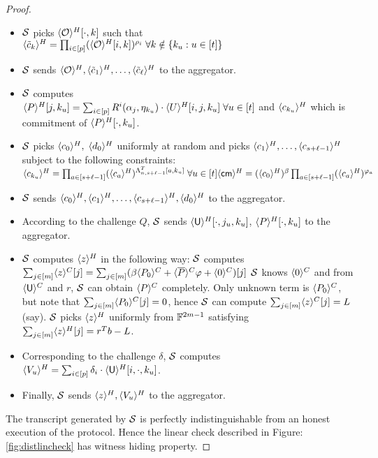 \begin{proof}
\begin{itemize}
		\item $\mathcal{S}$ picks $\langle{\mathcal{O}}\rangle^H[\cdot,k]$ such that\\
		$\langle{\tilde{c}_k}\rangle^H = \prod_{i\in[p]} (\langle{\mathcal{O}}\rangle^H[i,k])^{\rho_i} \; \forall k\notin \{k_u:u\in[t]\}$
		
		\item $\mathcal{S}$ sends $\langle{\mathcal{O}}\rangle^H, \langle{\tilde{c}_{1}}\rangle^H, \ldots, \langle{\tilde{c}_{\ell}}\rangle^H$ to the aggregator.
		
		\item $\mathcal{S}$ computes\\
		 $\langle{P}\rangle^H[j,k_u] = \sum_{i\in[p]} R^i(\alpha_j, \eta_{k_u})\cdot \langle{U}\rangle^H[i,j,k_u] \; \forall u\in[t]$ and $\langle{c_{k_u}}\rangle^H$ which is commitment of $\langle{P}\rangle^H[\cdot,k_u]$.
		 
		 \item $\mathcal{S}$ picks $\langle{c_0}\rangle^H,\;\langle{d_0}\rangle^H$ uniformly at random and picks $\langle{c_1}\rangle^H, \ldots, \langle{c_{s+\ell-1}}\rangle^H$ subject to the following constraints:\\
		 	$\langle{c_{k_u}}\rangle^H = \prod_{a\in[s+\ell-1]}(\langle{c_a}\rangle^H)^{\Lambda_{n,s+\ell-1}^T[a,k_u]} \; \forall u\in[t]\\
		 	\langle{\mathsf{cm}}\rangle^H = (\langle{c_0}\rangle^H)^{\beta}\prod_{a\in[s+\ell-1]} (\langle{c_a}\rangle^H)^{\varphi_a}$
		 
		 \item $\mathcal{S}$ sends $\langle{c_0}\rangle^H, \langle{c_1}\rangle^H,\ldots, \langle{c_{s+\ell-1}}\rangle^H, \langle{d_0}\rangle^H$ to the aggregator.
		 
		 \item According to the challenge $Q$, $\mathcal{S}$ sends $\langle{\mathsf{U}}\rangle^H[\cdot, j_u,k_u]$, $\langle{P}\rangle^H[\cdot,k_u]$ to the aggregator.
		 
		 \item $\mathcal{S}$ computes $\langle{z}\rangle^H$ in the following way:
		 $\mathcal{S}$ computes \\
		 	$\sum_{j\in[m]}\langle{z}\rangle^C[j] 
		 	=\sum_{j\in[m]} (\beta \langle{P_0}\rangle^C+\langle{\overline{P}}\rangle^C\varphi + \langle{0}\rangle^C)[j]$
		 $\mathcal{S}$ knows $\langle{0}\rangle^C$ and from $\langle{\mathsf{U}}\rangle^C$ and $r$, $\mathcal{S}$ can obtain $\langle{P}\rangle^C$ completely. Only unknown term is $\langle{P_0}\rangle^C$, but note that $\sum_{j\in[m]}\langle{P_0}\rangle^C[j] = 0$, hence $\mathcal{S}$ can compute $\sum_{j\in[m]}\langle{z}\rangle^C[j] = L$ (say).
		 $\mathcal{S}$ picks $\langle{z}\rangle^H$ uniformly from $\mathbb{F}^{2m-1}$ satisfying $\sum_{j\in[m]} \langle{z}\rangle^H[j]= r^Tb-L$.
		 
		 \item Corresponding to the challenge $\delta$, $\mathcal{S}$ computes $\langle{V_u}\rangle^H = \sum_{i\in[p]} \delta_i\cdot \langle{\mathsf{U}}\rangle^H[i,\cdot, k_u]$.
		 
		 \item Finally, $\mathcal{S}$ sends $\langle{z}\rangle^H, \langle{V_u}\rangle^H$ to the aggregator.
	\end{itemize}
The transcript generated by $\mathcal{S}$ is perfectly indistinguishable from an honest execution of the protocol. Hence the linear check described in Figure: \ref{fig:distlincheck} has witness hiding property.
\end{proof}

